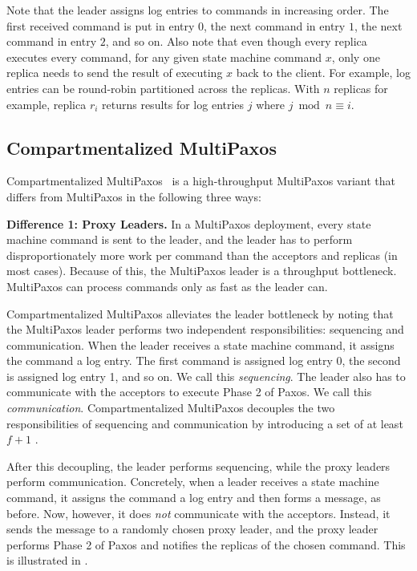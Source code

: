 Note that the leader assigns log entries to commands in increasing order. The
first received command is put in entry $0$, the next command in entry $1$, the
next command in entry $2$, and so on.
%
Also note that even though every replica executes every command, for any given
state machine command $x$, only one replica needs to send the result of
executing $x$ back to the client. For example, log entries can be round-robin
partitioned across the replicas. With $n$ replicas for example, replica $r_i$
returns results for log entries $j$ where $j \bmod n \equiv i$.

\subsection{Compartmentalized MultiPaxos}
Compartmentalized MultiPaxos~\cite{whittaker2020compartmentalized} is a
high-throughput MultiPaxos variant that differs from MultiPaxos in the
following three ways:

\textbf{Difference 1: Proxy Leaders.}
In a MultiPaxos deployment, every state machine command is sent to the leader,
and the leader has to perform disproportionately more work per command than the
acceptors and replicas (in most cases). Because of this, the MultiPaxos leader
is a throughput bottleneck. MultiPaxos can process commands only as fast as the
leader can.

Compartmentalized MultiPaxos alleviates the leader bottleneck by noting that
the MultiPaxos leader performs two independent responsibilities: sequencing and
communication. When the leader receives a state machine command, it assigns the
command a log entry. The first command is assigned log entry 0, the second is
assigned log entry 1, and so on. We call this \emph{sequencing}. The leader
also has to communicate with the acceptors to execute Phase 2 of Paxos. We call
this \emph{communication}. Compartmentalized MultiPaxos decouples the two
responsibilities of sequencing and communication by introducing a set of at
least $f+1$ .

After this decoupling, the leader performs sequencing, while the proxy leaders
perform communication. Concretely, when a leader receives a state machine
command, it assigns the command a log entry and then forms a 
message, as before. Now, however, it does \emph{not} communicate with the
acceptors.  Instead, it sends the  message to a randomly
chosen proxy leader, and the proxy leader performs Phase 2 of Paxos and
notifies the replicas of the chosen command. This is illustrated in
.

